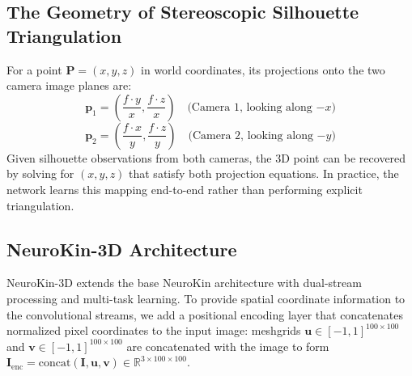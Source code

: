 \documentclass[12pt,a4paper,oneside]{report}
\begin{document}
\subsection{The Geometry of Stereoscopic Silhouette Triangulation}
For a point $\mathbf{P} = (x, y, z)$ in world coordinates, its projections onto the two camera image planes are:
\begin{equation}
\mathbf{p}_1 = \left( \frac{f \cdot y}{x}, \frac{f \cdot z}{x} \right) \quad \text{(Camera 1, looking along $-x$)}
\end{equation}
\begin{equation}
\mathbf{p}_2 = \left( \frac{f \cdot x}{y}, \frac{f \cdot z}{y} \right) \quad \text{(Camera 2, looking along $-y$)}
\end{equation}
Given silhouette observations from both cameras, the 3D point can be recovered by solving for $(x, y, z)$ that satisfy both projection equations. In practice, the network learns this mapping end-to-end rather than performing explicit triangulation.

\subsection{NeuroKin-3D Architecture}
NeuroKin-3D extends the base NeuroKin architecture with dual-stream processing and multi-task learning. To provide spatial coordinate information to the convolutional streams, we add a positional encoding layer that concatenates normalized pixel coordinates to the input image: meshgrids $\mathbf{u} \in [-1, 1]^{100 \times 100}$ and $\mathbf{v} \in [-1, 1]^{100 \times 100}$ are concatenated with the image to form $\mathbf{I}_{\text{enc}} = \text{concat}(\mathbf{I}, \mathbf{u}, \mathbf{v}) \in \mathbb{R}^{3 \times 100 \times 100}$.
\end{document}
